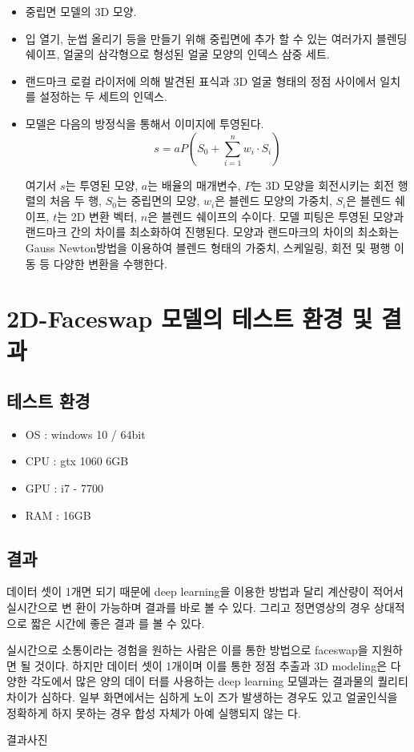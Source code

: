 \documentclass{oblivoir}
\newcommand{\spec}{
    \begin{itemize}
        \item OS : windows 10 / 64bit
        \item CPU : gtx 1060 6GB
        \item GPU : i7 - 7700
        \item RAM : 16GB
    \end{itemize}
    }
\begin{document}
\begin{itemize}
    \item 중립면 모델의 3D 모양.
    \item 입 열기, 눈썹 올리기 등을 만들기 위해 중립면에 추가 할 수 있는 여러가지 블렌딩 쉐이프, 얼굴의 삼각형으로 형성된 얼굴 모양의 인덱스 삼중 세트.
    \item 랜드마크 로컬 라이저에 의해 발견된 표식과 3D 얼굴 형태의 정점 사이에서 일치를 설정하는 두 세트의 인덱스.
    \item 모델은 다음의 방정식을 통해서 이미지에 투영된다.
    \[ s = aP \left( S_{0} + \sum_{i=1}^{n} w_{i}\cdot S_{i}  \right)   \]

    여기서 $s$는 투영된 모양, $a$는 배율의 매개변수, $P$는 3D 모양을 회전시키는 회전 행렬의 처음 두 행, $S_0$는 중립면의 모양, $w_i$은 블렌드 모양의 가중치, $S_i$은 블렌드 쉐이프, $t$는 2D 변환 벡터, $n$은 블렌드 쉐이프의 수이다.
    모델 피팅은 투영된 모양과 랜드마크 간의 차이를 최소화하여 진행된다. 모양과 랜드마크의 차이의 최소화는 Gauss Newton방법을 이용하여 블렌드 형태의 가중치, 스케일링, 회전 및 평행 이동 등 다양한 변환을 수행한다.\cite{reference9}
\end{itemize}

\section{2D-Faceswap 모델의 테스트 환경 및 결과}

\subsection{테스트 환경}
\spec
\subsection{결과}

데이터 셋이 1개면 되기 때문에 deep learning을 이용한 방법과 달리 계산량이 적어서 실시간으로 변 환이 가능하며 결과를 바로 볼 수 있다. 그리고 정면영상의 경우 상대적으로 짧은 시간에 좋은 결과 를 볼 수 있다.

실시간으로 소통이라는 경험을 원하는 사람은 이를 통한 방법으로 faceswap을 지원하면 될 것이다.  하지만 데이터 셋이 1개이며 이를 통한 정점 추출과 3D modeling은 다양한 각도에서 많은 양의 데이 터를 사용하는 deep learning 모델과는 결과물의 퀄리티 차이가 심하다. 일부 화면에서는 심하게 노이 즈가 발생하는 경우도 있고 얼굴인식을 정확하게 하지 못하는 경우 합성 자체가 아예 실행되지 않는 다.

결과사진 
\end{document}
